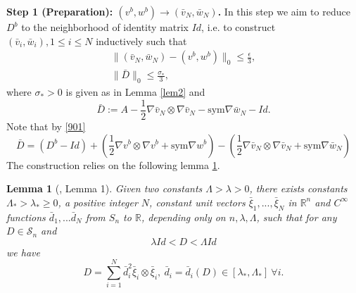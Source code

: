 \documentclass[reqno,12pt]{amsart}
\numberwithin{equation}{section}
\theoremstyle{plain}
\newtheorem{lem}[thm]{Lemma}
\theoremstyle{definition}
\newcommand{\R}{\mathbb{R}}
\renewcommand{\S}{{\mathcal{S}_n}}
\newcommand{\sym}{\text{sym}}
\begin{document}
\textbf{Step 1 (Preparation): $(v^b,w^b)\to(\bar v_N,\bar w_N)$.}
In this step we aim to reduce $D^b$ to the neighborhood of identity matrix $Id$, i.e. to construct $(\bar v_i,\bar w_i),1\le i\le N$ inductively such that
\begin{gather}
    \|(\bar v_N,\bar w_N)-(v^b,w^b)\|_{0}\le \frac{\epsilon}{3}, \label{barvN}\\
    \|\bar D\|_0\le\frac{\sigma_*}{3} \label{barD},
\end{gather}
where $\sigma_*>0$ is given as in Lemma \ref{lem2} and
\begin{equation}
\bar D:=A-\frac{1}{2}\nabla\bar v_N\otimes\nabla\bar v_N-\sym\nabla\bar w_N-Id.
\end{equation}
Note that by \eqref{901}
\begin{equation}\label{903}
    \bar D=(D^b-Id) + (\frac{1}{2}\nabla v^b\otimes\nabla v^b+\sym\nabla w^b)-(\frac{1}{2}\nabla\bar v_N\otimes\nabla\bar v_N+\sym\nabla\bar w_N)
\end{equation}
The construction relies on the following lemma \ref{lem1}.
\begin{lem}[\cite{nash}, Lemma 1]\label{lem1}
    Given two constants $\Lambda>\lambda>0$, there exists constants $\Lambda_*>\lambda_*\ge 0$, a positive integer $N$, constant unit vectors $ \bar{\xi}_1,..., \bar{\xi}_N$ in $\R^n$ and $C^\infty$ functions $\bar d_1,...\bar d_N$ from $S_n$ to $\R$, depending only on $n,\lambda,\Lambda$, such that for any $D\in\S$ and
    \begin{equation*}
    \lambda Id<D<\Lambda Id
    \end{equation*}
    we have
    \begin{equation*}
    D=\sum_{i=1}^{N}\bar d_i^2 \bar{\xi}_i\otimes \bar{\xi}_i,\  \bar{d}_i= \bar{d}_i(D)\in [\lambda_*,\Lambda_*]\ \forall i.
    \end{equation*}
\end{lem}
\end{document}
